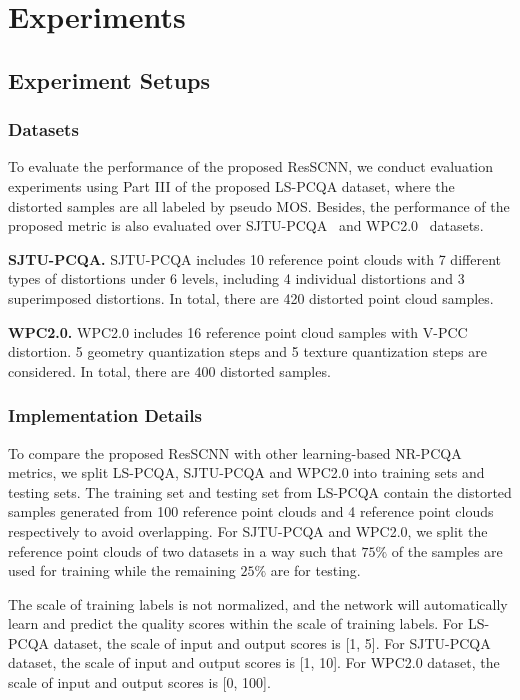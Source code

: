 \documentclass[acmsmall]{acmart}
\begin{document}
\section{Experiments}\label{sec:experiment}

\subsection{Experiment Setups}

\subsubsection{Datasets}

\par To evaluate the performance of the proposed ResSCNN, we conduct evaluation experiments using Part III of the proposed LS-PCQA dataset, where the distorted samples are all labeled by pseudo MOS. Besides, the performance of the proposed metric is also evaluated over SJTU-PCQA~\cite{Yang2020TMM3DTO2D} and WPC2.0~\cite{Su2019WPC,Liu2022WPC} datasets.

\textbf{SJTU-PCQA.} SJTU-PCQA includes 10 reference point clouds with 7 different types of distortions under 6 levels, including 4 individual distortions and 3 superimposed distortions. In total, there are 420 distorted point cloud samples.

\textbf{WPC2.0.} WPC2.0 includes 16 reference point cloud samples with V-PCC distortion. 5 geometry quantization steps and 5 texture quantization steps are considered. In total, there are 400 distorted samples.


\subsubsection{Implementation Details}

 \par To compare the proposed ResSCNN with other learning-based NR-PCQA metrics, we split LS-PCQA, SJTU-PCQA and WPC2.0 into training sets and testing sets. The training set and testing set from LS-PCQA contain the distorted samples generated from 100 reference point clouds and 4 reference point clouds respectively to avoid overlapping. For SJTU-PCQA and WPC2.0, we split the reference point clouds of two datasets in a way such that $75\%$ of the samples are used for training while the remaining $25\%$ are for testing.

\par The scale of training labels is not normalized, and the network will automatically learn and predict the quality scores within the scale of training labels. For LS-PCQA dataset, the scale of input and output scores is [1, 5]. For SJTU-PCQA dataset, the scale of input and output scores is [1, 10]. For WPC2.0 dataset, the scale of input and output scores is [0, 100].
\end{document}
